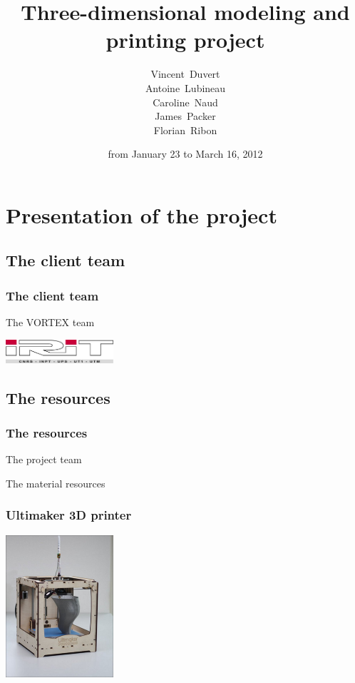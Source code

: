 \documentclass{beamer}
\title{Three-dimensional modeling and printing project}
\subtitle{}
\author[V. D., A. L., C. N., J. P., F. R.]{\scriptsize
Vincent~Duvert \\ Antoine~Lubineau \\ Caroline~Naud \\ James~Packer \\ Florian~Ribon}
\date{from January 23 to March 16, 2012}
\begin{document}
\frame{\titlepage}

\section{Presentation of the project}

\subsection{The client team}
\begin{frame}
	\frametitle{The client team}
	
	\begin{block}{The \textsc{VORTEX} team}
    \end{block}
    
    \begin{center}
		\includegraphics[width=4cm]{irit}	
	\end{center}
    
\end{frame}

\subsection{The resources}
\begin{frame}
	\frametitle{The resources}
	
	\begin{block}{The project team}
    \end{block}
    
    \begin{block}{The material resources}
    \end{block}
      
\end{frame}

\begin{frame}
	\frametitle{Ultimaker 3D printer}

    \begin{center}
		\includegraphics[width=4cm]{Ultimaker}	
	\end{center}
    
\end{frame}
\end{document}
